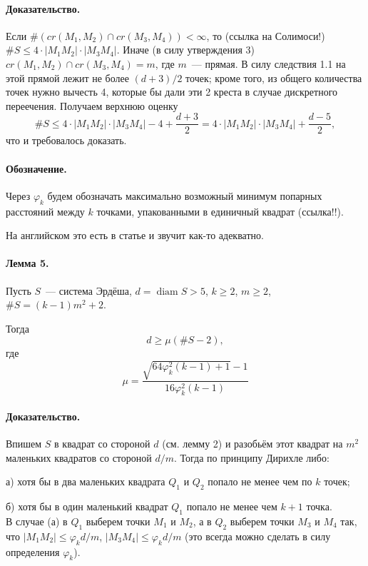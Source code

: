 \documentclass[a4paper,14pt]{article} %
\begin{document}
\paragraph{Доказательство.}
Если $\#(cr(M_1, M_2) \cap cr(M_3, M_4)) < \infty$,
то (ссылка на Солимоси!)
$\#S \leq 4 \cdot |M_1 M_2| \cdot |M_3 M_4|$.
Иначе (в силу утверждения 3) $cr(M_1, M_2) \cap cr(M_3, M_4) = m$,
где $m$~--- прямая.
В силу следствия 1.1 на этой прямой лежит не более $(d+3)/2$ точек;
кроме того, из общего количества точек нужно вычесть 4,
которые бы дали эти 2 креста в случае дискретного переечения.
Получаем верхнюю оценку
\begin{equation}
	\#S \leq 4 \cdot |M_1 M_2| \cdot |M_3 M_4| - 4 + \frac{d+3}{2}
	=
	4 \cdot |M_1 M_2| \cdot |M_3 M_4| + \frac{d-5}{2},
\end{equation}
что и требовалось доказать.

\paragraph{Обозначение.}
Через $\varphi_k$ будем обозначать максимально возможный минимум попарных расстояний между $k$ точками,
упакованными в единичный квадрат (ссылка!!).

На английском это есть в статье и звучит как-то адекватно.

\paragraph{Лемма 5.}
Пусть $S$~--- система Эрдёша,
$d = \mathop{diam} S > 5$,
$k \geq 2$,
$m \geq 2$,
$ \#S = (k-1)m^2 + 2$.

Тогда
\begin{equation}
	d \geq \mu (\#S - 2),
\end{equation}
где
\begin{equation}
	\mu = \frac{\sqrt{64\varphi_k^2 (k-1)+1}-1}{16\varphi_k^2 (k-1)}
\end{equation}

\paragraph{Доказательство.}
Впишем $S$ в квадрат со стороной $d$ (см. лемму 2)
и разобьём этот квадрат на $m^2$ маленьких квадратов со стороной $d/m$.
Тогда по принципу Дирихле либо:

а) хотя бы в два маленьких квадрата $Q_1$ и $Q_2$ попало не менее чем по $k$ точек;

б) хотя бы в один маленький квадрат $Q_1$ попало не менее чем $k+1$ точка.
\\
В случае (а) в $Q_1$ выберем точки $M_1$ и $M_2$,
а в $Q_2$ выберем точки $M_3$ и $M_4$
так, что $|M_1 M_2| \leq \varphi_k d /m$, $|M_3 M_4| \leq \varphi_k d/m$
(это всегда можно сделать в силу определения $\varphi_k$).
\end{document}
